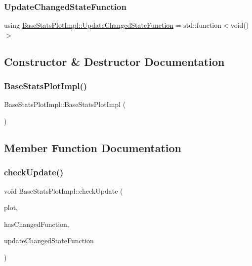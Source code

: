 \subsubsection{\texorpdfstring{UpdateChangedStateFunction}{UpdateChangedStateFunction}}
{\footnotesize\ttfamily using \mbox{\hyperlink{class_base_stats_plot_impl_a906285829f153a9f28fb245213a2916a}{Base\+Stats\+Plot\+Impl\+::\+Update\+Changed\+State\+Function}} =  std\+::function$<$void()$>$\hspace{0.3cm}{\ttfamily [protected]}}



\subsection{Constructor \& Destructor Documentation}
\mbox{\label{class_base_stats_plot_impl_a8598dedaae4f37264f53d191efdeb671}} 
\subsubsection{\texorpdfstring{BaseStatsPlotImpl()}{BaseStatsPlotImpl()}}
{\footnotesize\ttfamily Base\+Stats\+Plot\+Impl\+::\+Base\+Stats\+Plot\+Impl (\begin{DoxyParamCaption}{ }\end{DoxyParamCaption})\hspace{0.3cm}{\ttfamily [inline]}}



\subsection{Member Function Documentation}
\mbox{\label{class_base_stats_plot_impl_add1e42def057442b4198158e003ae226}} 
\subsubsection{\texorpdfstring{checkUpdate()}{checkUpdate()}}
{\footnotesize\ttfamily void Base\+Stats\+Plot\+Impl\+::check\+Update (\begin{DoxyParamCaption}\item[{\mbox{\hyperlink{class_q_custom_plot}{Q\+Custom\+Plot}} $\ast$}]{plot,  }\item[{\mbox{\hyperlink{class_base_stats_plot_impl_a948f49df97d1bd9824b08d6aeb83b3c7}{Base\+Stats\+Plot\+Impl\+::\+Has\+Changed\+Function}}}]{has\+Changed\+Function,  }\item[{\mbox{\hyperlink{class_base_stats_plot_impl_a906285829f153a9f28fb245213a2916a}{Base\+Stats\+Plot\+Impl\+::\+Update\+Changed\+State\+Function}}}]{update\+Changed\+State\+Function }\end{DoxyParamCaption})\hspace{0.3cm}{\ttfamily [protected]}}

